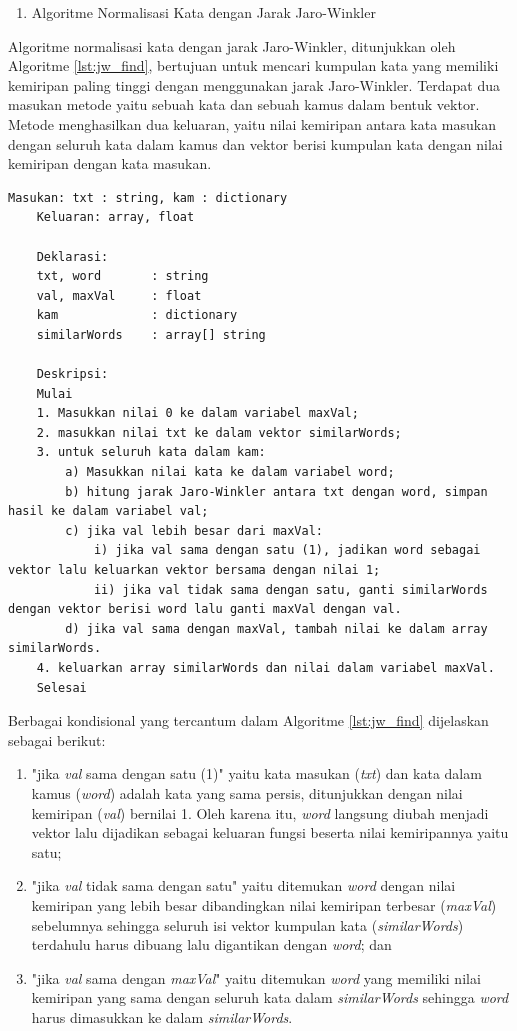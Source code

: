 \begin{enumerate}[resume*=process_list]
	\item Algoritme Normalisasi Kata dengan Jarak Jaro-Winkler
\end{enumerate}

Algoritme normalisasi kata dengan jarak Jaro-Winkler, ditunjukkan oleh Algoritme \ref{lst:jw_find}, bertujuan untuk mencari kumpulan kata yang memiliki kemiripan paling tinggi dengan menggunakan jarak Jaro-Winkler. Terdapat dua masukan metode yaitu sebuah kata dan sebuah kamus dalam bentuk vektor. Metode menghasilkan dua keluaran, yaitu nilai kemiripan antara kata masukan dengan seluruh kata dalam kamus dan vektor berisi kumpulan kata dengan nilai kemiripan dengan kata masukan.
\begin{lstlisting}[caption={Algoritme Fungsi Normalisasi Kata dengan Jarak Jaro-Winkler},label={lst:jw_find},float=ht]
	Masukan: txt : string, kam : dictionary
	Keluaran: array, float
	
	Deklarasi:
	txt, word		: string
	val, maxVal 	: float
	kam				: dictionary
	similarWords	: array[] string
	
	Deskripsi:
	Mulai
	1. Masukkan nilai 0 ke dalam variabel maxVal;
	2. masukkan nilai txt ke dalam vektor similarWords;
	3. untuk seluruh kata dalam kam:
		a) Masukkan nilai kata ke dalam variabel word;
		b) hitung jarak Jaro-Winkler antara txt dengan word, simpan hasil ke dalam variabel val;
		c) jika val lebih besar dari maxVal:
			i) jika val sama dengan satu (1), jadikan word sebagai vektor lalu keluarkan vektor bersama dengan nilai 1;
			ii) jika val tidak sama dengan satu, ganti similarWords dengan vektor berisi word lalu ganti maxVal dengan val.
		d) jika val sama dengan maxVal, tambah nilai ke dalam array similarWords.
	4. keluarkan array similarWords dan nilai dalam variabel maxVal.
	Selesai
\end{lstlisting}

Berbagai kondisional yang tercantum dalam Algoritme \ref{lst:jw_find} dijelaskan sebagai berikut:
\begin{enumerate}
	\item "jika \textit{val} sama dengan satu (1)" yaitu kata masukan (\textit{txt}) dan kata dalam kamus (\textit{word}) adalah kata yang sama persis, ditunjukkan dengan nilai kemiripan (\textit{val}) bernilai 1. Oleh karena itu, \textit{word} langsung diubah menjadi vektor lalu dijadikan sebagai keluaran fungsi beserta nilai kemiripannya yaitu satu;
	\item "jika \textit{val} tidak sama dengan satu" yaitu ditemukan \textit{word} dengan nilai kemiripan yang lebih besar dibandingkan nilai kemiripan terbesar (\textit{maxVal}) sebelumnya sehingga seluruh isi vektor kumpulan kata (\textit{similarWords}) terdahulu harus dibuang lalu digantikan dengan \textit{word}; dan
	\item "jika \textit{val} sama dengan \textit{maxVal}" yaitu ditemukan \textit{word} yang memiliki nilai kemiripan yang sama dengan seluruh kata dalam \textit{similarWords} sehingga \textit{word} harus dimasukkan ke dalam \textit{similarWords}.
\end{enumerate}

